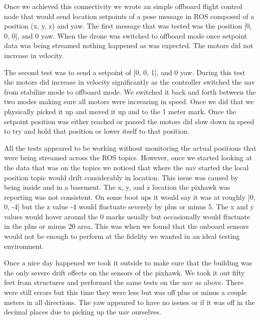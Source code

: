 \begin{itemize}
\begin{itemize}
\noindent Once we achieved this connectivity we wrote an simple offboard flight control node that would send location setpoints of a pose message in ROS composed of a position (x, y, z) and yaw. The first message that was tested was the position [0, 0, 0], and 0 yaw. When the drone was switched to offboard mode once setpoint data was being streamed nothing happened as was expected. The motors did not increase in velocity.\par

\noindent The second test was to send a setpoint of [0, 0, 1], and 0 yaw. During this test the motors did increase in velocity significantly as the controller switched the uav from stabilize mode to offboard mode. We switched it back and forth between the two modes making sure all motors were increasing in speed. Once we did that we physically picked it up and moved it up and to the 1 meter mark. Once the setpoint position was either reached or passed the motors did slow down in speed to try and hold that position or lower itself to that position.\par

\noindent All the tests appeared to be working without monitoring the actual positions that were being streamed across the ROS topics. However, once we started looking at the data that was on the topics we noticed that where the uav started the local position topic would drift considerably in location. This issue was caused by being inside and in a basement. The x, y, and z location the pixhawk was reporting was not consistent. On some boot ups it would say it was at roughly [0, 0, -4] but the z value -4 would fluctuate severely by plus or minus 5. The x and y values would hover around the 0 marks usually but occasionally would fluctuate in the plus or minus 20 area. This was when we found that the onboard sensors would not be enough to perform at the fidelity we wanted in an ideal testing environment.\par

\noindent Once a nice day happened we took it outside to make sure that the building was the only severe drift effects on the sensors of the pixhawk. We took it out fifty feet from structures and performed the same tests on the uav as above. There were still errors but this time they were less but was off plus or minus a couple meters in all directions. The yaw appeared to have no issues or if it was off in the decimal places due to picking up the uav ourselves.\par 


\end{itemize}
\end{itemize}
